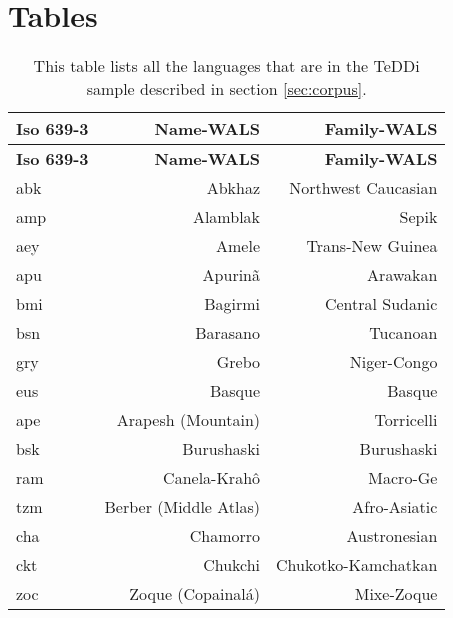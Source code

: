 \chapter{Tables}
\label{annex:Tables}

\begin{longtable}{|l|r|r|}
\caption[TeDDi sample]{This table lists all the languages that are in the TeDDi sample described in section \ref{sec:corpus}.}\\\hline
\textbf{Iso 639-3} & \textbf{Name-WALS}        & \textbf{Family-WALS} \\\hline\hline
\endfirsthead
\hline
\textbf{Iso 639-3} & \textbf{Name-WALS}        & \textbf{Family-WALS} \\\hline\hline
\endhead
\hline
\endfoot
\hline
\endlastfoot
abk                & Abkhaz                    & Northwest Caucasian  \\
amp                & Alamblak                  & Sepik                \\
aey                & Amele                     & Trans-New Guinea     \\
apu                & Apurinã                   & Arawakan             \\
bmi                & Bagirmi                   & Central Sudanic      \\
bsn                & Barasano                  & Tucanoan             \\
gry                & Grebo                     & Niger-Congo          \\
eus                & Basque                    & Basque               \\
ape                & Arapesh (Mountain)        & Torricelli           \\
bsk                & Burushaski                & Burushaski           \\
ram                & Canela-Krahô              & Macro-Ge             \\
tzm                & Berber (Middle Atlas)     & Afro-Asiatic         \\
cha                & Chamorro                  & Austronesian         \\
ckt                & Chukchi                   & Chukotko-Kamchatkan  \\
zoc                & Zoque (Copainalá)         & Mixe-Zoque           \\

\end{longtable}
